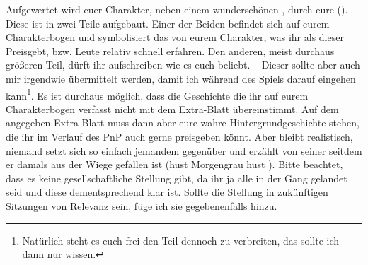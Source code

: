 Aufgewertet wird euer Charakter, neben einem wunderschönen , durch eure  ().
Diese ist in zwei Teile aufgebaut.
Einer der Beiden befindet sich auf eurem Charakterbogen und symbolisiert das von eurem Charakter, was ihr als dieser Preisgebt, bzw. Leute relativ schnell erfahren.
Den anderen, meist durchaus größeren Teil, dürft ihr aufschreiben wie es euch beliebt. 
-- Dieser sollte aber auch mir irgendwie übermittelt werden, damit ich während des Spiels darauf eingehen kann\footnote{Natürlich steht es euch frei den Teil dennoch zu verbreiten, das sollte ich dann nur wissen.}.
Es ist durchaus möglich, dass die Geschichte die ihr auf eurem Charakterbogen verfasst nicht mit dem Extra-Blatt übereinstimmt. Auf dem angegeben Extra-Blatt muss dann aber eure wahre Hintergrundgeschichte stehen, die ihr im Verlauf des PnP auch gerne preisgeben könnt. 
Aber bleibt realistisch, niemand setzt sich so einfach jemandem gegenüber und erzählt von seiner  seitdem er damals aus der Wiege gefallen ist (hust Morgengrau hust \Tongey).
Bitte beachtet, dass es keine gesellschaftliche Stellung gibt, da ihr ja alle in der Gang gelandet seid und diese dementsprechend klar ist. Sollte die Stellung in zukünftigen Sitzungen von Relevanz sein, füge ich sie gegebenenfalls hinzu.



